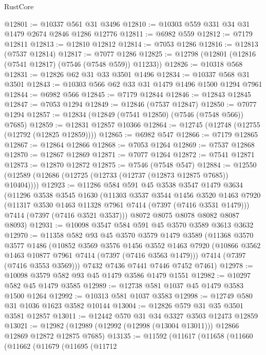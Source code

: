 \begin{lexlean}{RustCore}
\begin{coremodule}
@12801 := @10337 @561 @31 @3496
@12810 := @10303 @559 @331 @34 @31 @1479 @2674 @2846 @1286 @12776
@12811 := @6982 @559
@12812 := @7179 @12811
@12813 := @12810 @12812
@12814 := @7053 @1286
@12816 := @12813 (@7537 @12814)
@12817 := @7077 @1286
@12825 := @12798 (@12801 (@12816 (@7541 @12817) (@7546 (@7548 @559)) @11233))
@12826 := @10318 @568
@12831 := @12826 @62 @31 @33 @3501 @1496
@12834 := @10337 @568 @31 @3501
@12843 := @10303 @566 @62 @33 @31 @1479 @1496 @1500 @1294 @7961
@12844 := @6982 @566
@12845 := @7179 @12844
@12846 := @12843 @12845
@12847 := @7053 @1294
@12849 := @12846 (@7537 @12847)
@12850 := @7077 @1294
@12857 := @12834 (@12849 (@7541 @12850) (@7546 (@7548 @566)) @7685)
@12859 := @12831 @12857 @10366
@12864 := @12745 (@12748 (@12755 (@12792 (@12825 @12859))))
@12865 := @6982 @547
@12866 := @7179 @12865
@12867 := @12864 @12866
@12868 := @7053 @1264
@12869 := @7537 @12868
@12870 := @12867 @12869
@12871 := @7077 @1264
@12872 := @7541 @12871
@12873 := @12870 @12872
@12875 := @7546 (@7548 @547)
@12884 := @12550 (@12589 (@12686 (@12725 (@12733 (@12737 (@12873 @12875 @7685)) @10404))))
@12923 := @11286
    @584
    @591
    @45
    @3538
    @3547
    @1479
    @3634
    (@11296
      @3538
      @3545
      @1630
      (@11303
        @3537
        @3544
        @1456
        @3520
        @1463
        @7920
        (@11317 @3530 @1463 @11328 @7961 @7414 (@7397 (@7416 @3531 @1479)))
        @7414
        (@7397 (@7416 @3521 @3537)))
      @8072
      @8075
      @8078
      @8082
      @8087
      @8093)
@12931 := @10098 @3547 @584 @591 @45 @3570 @3589 @3613 @3632
@12970 := @11358
    @582
    @93
    @45
    @3570
    @3579
    @1479
    @3589
    (@11368
      @3570
      @3577
      @1486
      (@10852
        @3569
        @3576
        @1456
        @3552
        @1463
        @7920
        (@10866 @3562 @1463 @10877 @7961 @7414 (@7397 (@7416 @3563 @1479)))
        @7414
        (@7397 (@7416 @3553 @3569)))
      @7432
      @7436
      @7441
      @7446
      @7452
      @7461)
@12978 := @10098 @3579 @582 @93 @45 @1479 @3586 @1479 @1551
@12982 := @10297 @582 @45 @1479 @3585
@12989 := @12738 @581 @1037 @45 @1479 @3583 @1500 @1264
@12992 := @10313 @581 @1037 @3583
@12998 := @12749 @580 @31 @1036 @1623 @3582 @10144
@13004 := @12826 @579 @31 @35 @3501 @3581 @12857
@13011 := @12442 @570 @31 @34 @3327 @3503 @12473 @12859
@13021 := @12982 (@12989 (@12992 (@12998 (@13004 @13011))) @12866 @12869 @12872 @12875 @7685)
@13135 := @11592
    (@11617
      (@11658
        (@11660
          (@11662
            (@11679
              (@11695
                (@11712

\end{coremodule}
\end{lexlean}
